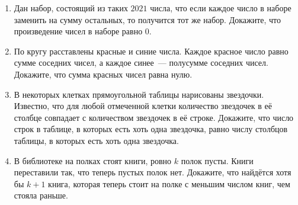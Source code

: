 \documentclass{article}
\begin{document}
\begin{enumerate}[label*=\protect\fbox{\arabic{enumi}}]
\item Дан набор, состоящий из таких $2021$ числа, что если каждое число в наборе заменить на сумму остальных, то получится тот же набор. 
Докажите, что произведение чисел в наборе равно $0$.

\item По кругу расставлены красные и синие числа. Каждое красное число равно сумме соседних чисел, а каждое синее~--- полусумме соседних чисел. Докажите, что сумма красных чисел равна нулю. 

\item В некоторых клетках прямоугольной таблицы нарисованы звездочки. Известно, что для любой отмеченной клетки количество звездочек в её столбце совпадает с количеством звездочек в её строке. Докажите, что число строк в таблице, в которых есть хоть одна звездочка, равно числу столбцов таблицы, в которых есть хоть одна звездочка.

\item В библиотеке на полках стоят книги, ровно $k$ полок пусты. Книги переставили так, что теперь пустых полок нет. Докажите, что найдётся хотя бы $k + 1$ книга, которая теперь стоит на полке с меньшим числом книг, чем стояла раньше.



\end{enumerate}
\end{document}
